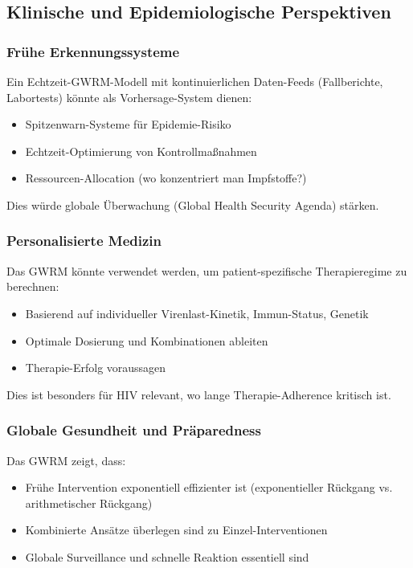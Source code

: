 ﻿\documentclass[a4paper,12pt]{article}
\theoremstyle{definition}
\begin{document}
\subsection{Klinische und Epidemiologische Perspektiven}

\subsubsection{Frühe Erkennungssysteme}
Ein Echtzeit-GWRM-Modell mit kontinuierlichen Daten-Feeds (Fallberichte, Labortests) könnte als Vorhersage-System dienen:
\begin{itemize}
\item Spitzenwarn-Systeme für Epidemie-Risiko
\item Echtzeit-Optimierung von Kontrollmaßnahmen
\item Ressourcen-Allocation (wo konzentriert man Impfstoffe?)
\end{itemize}

Dies würde globale Überwachung (Global Health Security Agenda) stärken.

\subsubsection{Personalisierte Medizin}
Das GWRM könnte verwendet werden, um patient-spezifische Therapieregime zu berechnen:
\begin{itemize}
\item Basierend auf individueller Virenlast-Kinetik, Immun-Status, Genetik
\item Optimale Dosierung und Kombinationen ableiten
\item Therapie-Erfolg voraussagen
\end{itemize}

Dies ist besonders für HIV relevant, wo lange Therapie-Adherence kritisch ist.

\subsubsection{Globale Gesundheit und Präparedness}
Das GWRM zeigt, dass:
\begin{itemize}
\item Frühe Intervention exponentiell effizienter ist (exponentieller Rückgang vs. arithmetischer Rückgang)
\item Kombinierte Ansätze überlegen sind zu Einzel-Interventionen
\item Globale Surveillance und schnelle Reaktion essentiell sind
\end{itemize}
\end{document}
